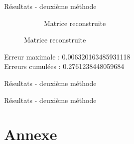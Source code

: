\documentclass{beamer}
\begin{document}
\begin{frame}{Résultats - deuxième méthode}
\begin{figure}[t]
\begin{subfigure}[b]{0.35\textwidth}
            \caption{Matrice reconstruite}
        \end{subfigure}
    \end{figure}
Erreur maximale : 0.006320163485931118\\
Erreurs cumulées : 0.2761238448059684
\end{frame}

\begin{frame}{Résultats - deuxième méthode}
	\begin{figure}
        \centering
    \end{figure}
\end{frame}

\begin{frame}{Résultats - deuxième méthode}
	\begin{figure}
        \centering
    \end{figure}
\end{frame}


\section{Annexe}
\end{document}
